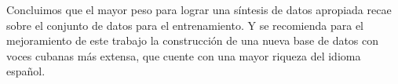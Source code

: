 \begin{recomendations}
   Concluimos que el mayor peso para lograr una síntesis de datos apropiada recae sobre el conjunto de datos para el entrenamiento. Y se recomienda para el mejoramiento de este trabajo la construcción de una nueva base de datos con voces cubanas más extensa, que cuente con una mayor riqueza del idioma español.
\end{recomendations}
